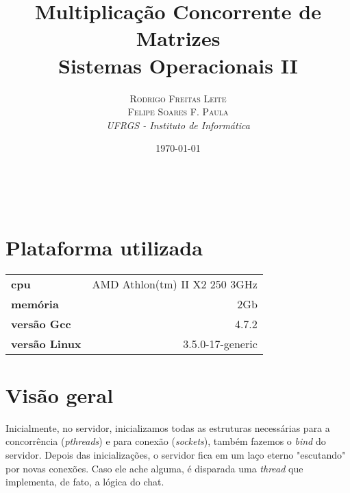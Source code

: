 \documentclass[a4paper, 11pt]{article} %
\title{\textbf{Multiplicação Concorrente de Matrizes}\\ %
Sistemas Operacionais II} %
\author{\textsc{Rodrigo Freitas Leite} \\ \textsc{Felipe Soares F. Paula} \\
{\textit{UFRGS - Instituto de Informática}}} %
\date{\today} %
\makeatletter
\renewcommand{\maketitle}{ %
\begin{flushright} %
{\LARGE\@title} %

\vspace{50pt} %

{\large\@author} %
\\\@date %

\vspace{40pt} %
\end{flushright}
}
\makeatother
\begin{document}
\maketitle %



\vspace{30pt} %


\section*{Plataforma utilizada}

\begin{center}
\begin{tabular}{|l | r|}
\hline
\textbf{cpu} & AMD Athlon(tm) II X2 250 3GHz  \\
\textbf{memória} & 2Gb \\
\textbf{versão Gcc} & 4.7.2 \\
\textbf{versão Linux} & 3.5.0-17-generic  \\
\hline
\end{tabular}
\end{center}





\section*{Visão geral}

Inicialmente, no servidor, inicializamos todas as estruturas necessárias para a concorrência (\textit{pthreads}) e para conexão (\textit{sockets}), também fazemos o \textit{bind} do servidor. Depois das inicializações, o servidor fica em um laço eterno "escutando" por novas conexões. Caso ele ache alguma, é disparada uma \textit{thread} que implementa, de fato, a lógica do chat. 
\end{document}
